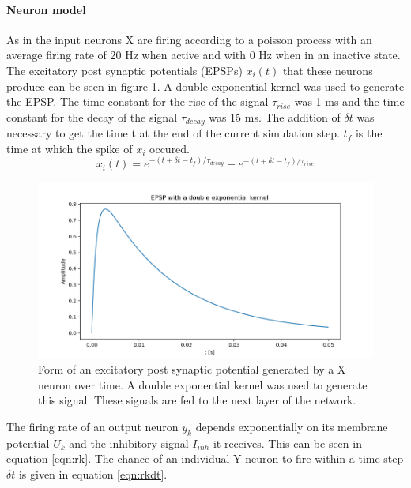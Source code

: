 \paragraph{Neuron model}

As in \citet{nessler} the input neurons X are firing according to a poisson process with an average firing rate of 20 Hz when active and with 0 Hz when in an inactive state. The excitatory post synaptic potentials (EPSPs) $x_i(t)$ that these neurons produce can be seen in figure \ref{fig:XSpike}. A double exponential kernel was used to generate the EPSP. The time constant for the rise of the signal $\tau_{rise}$ was 1 ms and the time constant for the decay of the signal $\tau_{decay}$ was 15 ms. The addition of $\delta t$ was necessary to get the time t at the end of the current simulation step. $t_f$ is the time at which the spike of $x_i$ occured.
\begin{equation}
\label{eqn:EPSP}
x_i(t) = e^{-(t + \delta t - t_f) / \tau_{decay}} - e^{-(t + \delta t - t_f) / \tau_{rise}}
\end{equation}


\begin{figure}
  \includegraphics[width=\linewidth]{figures/XSpike.png}
  \caption{Form of an excitatory post synaptic potential generated by a X neuron over time. A double exponential kernel was used to generate this signal. These signals are fed to the next layer of the network. }
  \label{fig:XSpike}
\end{figure}

The firing rate of an output neuron $y_k$ depends exponentially on its membrane potential $U_k$ and the inhibitory signal $I_{inh}$ it receives. This can be seen in equation \ref{eqn:rk}. The chance of an individual Y neuron to fire within a time step $\delta t$ is given in equation \ref{eqn:rkdt}.

